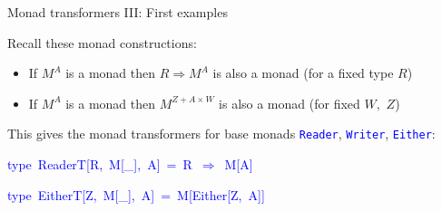 \documentclass[english]{beamer}
\newenvironment{lyxcode}
  {\par\begin{list}{}{
    \setlength{\rightmargin}{\leftmargin}
    \setlength{\listparindent}{0pt}%
    \raggedright
    \setlength{\itemsep}{0pt}
    \setlength{\parsep}{0pt}
    \normalfont\ttfamily}%
   \def\{{\char`\{}
   \def\}{\char`\}}
   \def\textasciitilde{\char`\~}
   \item[]}
  {\end{list}}
\begin{document}
\begin{frame}{Monad transformers III: First examples}

{\footnotesize{}\vspace{-0.15cm}}Recall these monad constructions:
\begin{itemize}
\item If $M^{A}$ is a monad then $R\Rightarrow M^{A}$ is also a monad
(for a fixed type $R$)
\item If $M^{A}$ is a monad then $M^{Z+A\times W}$ is also a monad (for
fixed $W,$ $Z$)
\end{itemize}
This gives the monad transformers for base monads \texttt{\textcolor{blue}{\footnotesize{}Reader}},
\texttt{\textcolor{blue}{\footnotesize{}Writer}}, \texttt{\textcolor{blue}{\footnotesize{}Either}}:
\begin{lyxcode}
\textcolor{blue}{\footnotesize{}type~ReaderT{[}R,~M{[}\_{]},~A{]}~=~R~$\Rightarrow$~M{[}A{]}}{\footnotesize\par}

\textcolor{blue}{\footnotesize{}type~EitherT{[}Z,~M{[}\_{]},~A{]}~=~M{[}Either{[}Z,~A{]}{]}}{\footnotesize\par}


\end{lyxcode}
\end{frame}
\end{document}
